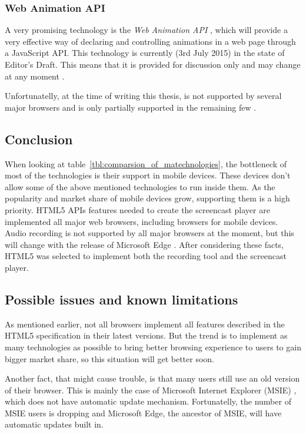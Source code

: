 \subsubsection*{Web Animation API}
A very promising technology is the \textit{Web Animation API} \cite{web_animation_api}, which will provide a very effective way of declaring and controlling animations in a web page through a JavaScript API. This technology is currently (3rd July 2015) in the state of Editor's Draft. This means that it is provided for discussion only and may change at any moment \cite{web_animations_draft}.

Unfortunatelly, at the time of writing this thesis, is not supported by several major browsers and is only partially supported in the remaining few \cite{ms_no_anim} \cite{anim_api_partial} \cite{anim_api_partial2}.

\subsection{Conclusion}
When looking at table~\ref{tbl:comparsion_of_matechnologies}, the bottleneck of most of the technologies is their support in mobile devices. These devices don't allow some of the above mentioned technologies to run inside them. As the popularity and market share of mobile devices grow, supporting them is a high priority. HTML5 APIs features needed to create the screencast player are implemented all major web browsers, including browsers for mobile devices. Audio recording is not supported by all major browsers at the moment, but this will change with the release of Microsoft Edge \cite{edge_getusermedia}. After considering these facts, HTML5 was selected to implement both the recording tool and the screencast player.

\subsection{Possible issues and known limitations}
As mentioned earlier, not all browsers implement all features described in the HTML5 specification in their latest versions. But the trend is to implement as many technologies as possible to bring better browsing experience to users to gain bigger market share, so this situation will get better soon.

Another fact, that might cause trouble, is that many users still use an old version of their browser. This is mainly the case of Microsoft Internet Explorer (MSIE) , which does not have automatic update mechanism. Fortunatelly, the number of MSIE users is dropping and Microsoft Edge, the ancestor of MSIE, will have automatic updates built in.

